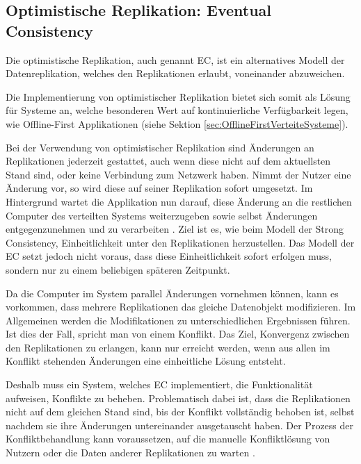 \documentclass[a4paper, 12pt]{scrreprt}
\begin{document}
\subsection{Optimistische Replikation: Eventual Consistency}

Die optimistische Replikation, auch genannt \acf{EC}, ist ein alternatives Modell der Datenreplikation, welches den Replikationen erlaubt, voneinander abzuweichen.

Die Implementierung von optimistischer Replikation bietet sich somit als Lösung für Systeme an, welche besonderen Wert auf kontinuierliche Verfügbarkeit legen, wie Offline-First Applikationen (siehe Sektion \ref{sec:OfflineFirstVerteiteSysteme}). 

Bei der Verwendung von optimistischer Replikation sind Änderungen an Replikationen jederzeit gestattet, auch wenn diese nicht auf dem aktuellsten Stand sind, oder keine Verbindung zum Netzwerk haben. Nimmt der Nutzer eine Änderung vor, so wird diese auf seiner Replikation sofort umgesetzt. Im Hintergrund wartet die Applikation nun darauf, diese Änderung an die restlichen Computer des verteilten Systems weiterzugeben sowie selbst Änderungen entgegenzunehmen und zu verarbeiten \autocite[S.46]{ArticleOptimisticReplication}. Ziel ist es, wie beim Modell der Strong Consistency, Einheitlichkeit unter den Replikationen herzustellen. Das Modell der \ac{EC} setzt jedoch nicht voraus, dass diese Einheitlichkeit sofort erfolgen muss, sondern nur zu einem beliebigen späteren Zeitpunkt. 

Da die Computer im System parallel Änderungen vornehmen können, kann es vorkommen, dass mehrere Replikationen das gleiche Datenobjekt modifizieren. Im Allgemeinen werden die Modifikationen zu unterschiedlichen Ergebnissen führen. Ist dies der Fall, spricht man von einem Konflikt. Das Ziel, Konvergenz zwischen den Replikationen zu erlangen, kann nur erreicht werden, wenn aus allen im Konflikt stehenden Änderungen eine einheitliche Lösung entsteht.

Deshalb muss ein System, welches \ac{EC} implementiert, die Funktionalität aufweisen, Konflikte zu beheben. Problematisch dabei ist, dass die Replikationen nicht auf dem gleichen Stand sind, bis der Konflikt vollständig behoben ist, selbst nachdem sie ihre Änderungen untereinander ausgetauscht haben. Der Prozess der Konfliktbehandlung kann voraussetzen, auf die manuelle Konfliktlösung von Nutzern oder die Daten anderer Replikationen zu warten \autocite{ArticleEventualConsistencyConflicts}.
\end{document}
